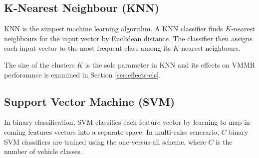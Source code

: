 \subsection{K-Nearest Neighbour (KNN)}
KNN is the simpest machine learning algorithm. 
A KNN classifier finds $K$-nearest neighbours for the input vector by Euclidean distance. 
The classifier then assigns each input vector to the most frequent class among its $K$-nearest neighbours.

The size of the clusters $K$ is the sole parameter in KNN and its effects on VMMR perforamnce is examined in Section \ref{sec:effects-cls}.

\subsection{Support Vector Machine (SVM)}
In binary classification, SVM classifies each feature vector by learning to map in-coming features vectors into a separate space.
In multi-calss scnerario, $C$ binary SVM classifiers are trained using the one-versus-all scheme, where $C$ is the number of vehicle classes.



